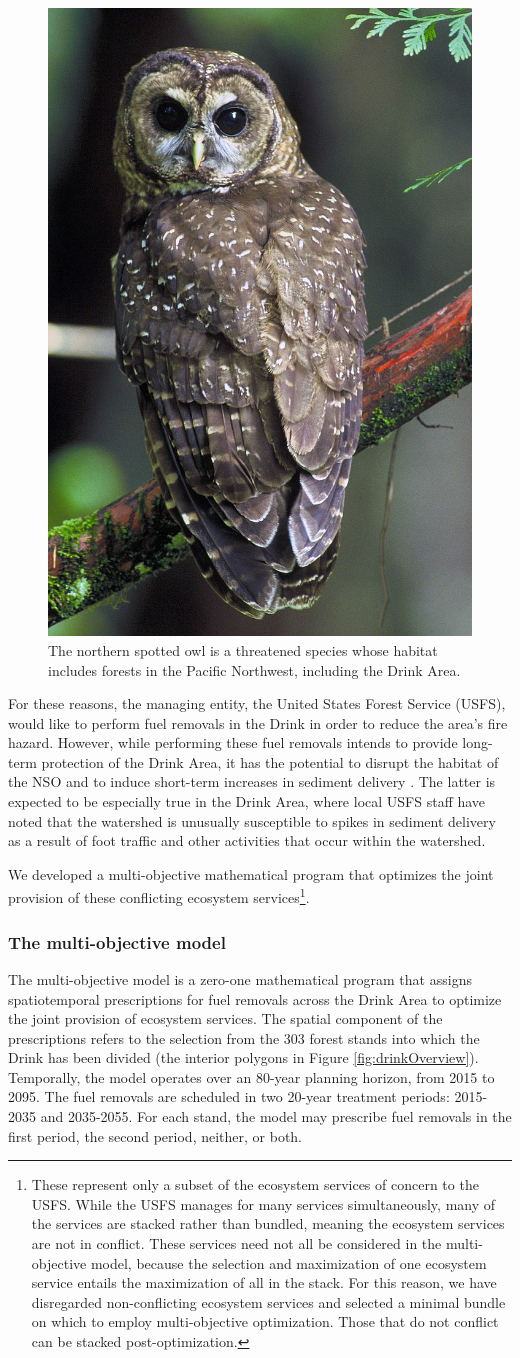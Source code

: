 \begin{figure}
\centering
\caption[Northern spotted owl]{The northern spotted owl is a threatened species whose habitat includes forests in the Pacific Northwest, including the Drink Area.}
\label{fig:nso}
\includegraphics[width=.2\textwidth]{../images/NorthernSpottedOwl_USFWS}
\end{figure}

For these reasons, the managing entity, the United States Forest Service (USFS), would like to perform fuel removals in the Drink in order to reduce the area's fire hazard. However, while performing these fuel removals intends to provide long-term protection of the Drink Area, it has the potential to disrupt the habitat of the NSO \cite{bond2002short} and to induce short-term increases in sediment delivery \cite{o2005conceptual}. The latter is expected to be especially true in the Drink Area, where local USFS staff have noted that the watershed is unusually susceptible to spikes in sediment delivery as a result of foot traffic and other activities that occur within the watershed.

We developed a multi-objective mathematical program that optimizes the joint provision of these conflicting ecosystem services\footnote{These represent only a subset of the ecosystem services of concern to the USFS. While the USFS manages for many services simultaneously, many of the services are stacked rather than bundled, meaning the ecosystem services are not in conflict. These services need not all be considered in the multi-objective model, because the selection and maximization of one ecosystem service entails the maximization of all in the stack. For this reason, we have disregarded non-conflicting ecosystem services and selected a minimal bundle on which to employ multi-objective optimization. Those that do not conflict can be stacked post-optimization.}.

\subsubsection{The multi-objective model}
The multi-objective model is a zero-one mathematical program that assigns spatiotemporal prescriptions for fuel removals across the Drink Area to optimize the joint provision of ecosystem services. The spatial component of the prescriptions refers to the selection from the 303 forest stands into which the Drink has been divided (the interior polygons in Figure \ref{fig:drinkOverview}). Temporally, the model operates over an 80-year planning horizon, from 2015 to 2095. The fuel removals are scheduled in two 20-year treatment periods: 2015-2035 and 2035-2055. For each stand, the model may prescribe fuel removals in the first period, the second period, neither, or both.

